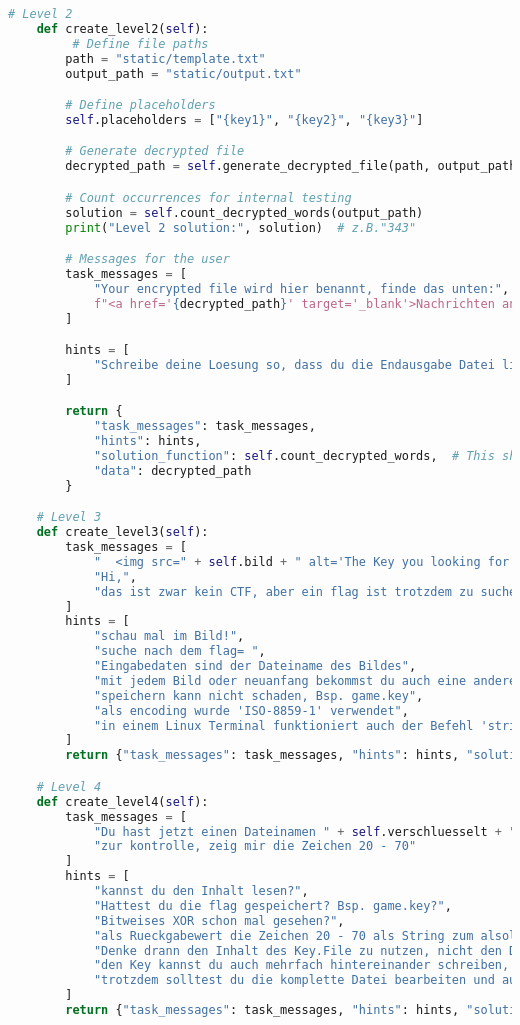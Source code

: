 \documentclass[a4paper 11pt]{article}
\begin{document}
\begin{lstlisting}[language=python, caption=der Raum]
    # Level 2
    def create_level2(self):
         # Define file paths
        path = "static/template.txt"
        output_path = "static/output.txt"

        # Define placeholders
        self.placeholders = ["{key1}", "{key2}", "{key3}"]

        # Generate decrypted file
        decrypted_path = self.generate_decrypted_file(path, output_path)

        # Count occurrences for internal testing
        solution = self.count_decrypted_words(output_path)
        print("Level 2 solution:", solution)  # z.B."343"

        # Messages for the user
        task_messages = [
            "Your encrypted file wird hier benannt, finde das unten:",
            f"<a href='{decrypted_path}' target='_blank'>Nachrichten ansehen</a>"
        ]

        hints = [
            "Schreibe deine Loesung so, dass du die Endausgabe Datei liest und die UTC-Zahlen ersetzt."
        ]

        return {
            "task_messages": task_messages,
            "hints": hints,
            "solution_function": self.count_decrypted_words,  # This should be your checker
            "data": decrypted_path
        }

    # Level 3
    def create_level3(self):
        task_messages = [
            "  <img src=" + self.bild + " alt='The Key you looking for' height='150'/> ",
            "Hi,",
			"das ist zwar kein CTF, aber ein flag ist trotzdem zu suchen",
        ]
        hints = [
            "schau mal im Bild!",
            "suche nach dem flag= ",
            "Eingabedaten sind der Dateiname des Bildes",
            "mit jedem Bild oder neuanfang bekommst du auch eine andere flag",
            "speichern kann nicht schaden, Bsp. game.key",
            "als encoding wurde 'ISO-8859-1' verwendet",
            "in einem Linux Terminal funktioniert auch der Befehl 'strings [Dateiname]' "
        ]
        return {"task_messages": task_messages, "hints": hints, "solution_function": STEGO.im_bild_finden, "data": self.bild}

    # Level 4
    def create_level4(self):
        task_messages = [
            "Du hast jetzt einen Dateinamen " + self.verschluesselt + ", schon mar reingeschaut?",
            "zur kontrolle, zeig mir die Zeichen 20 - 70"
        ]
        hints = [
            "kannst du den Inhalt lesen?",
            "Hattest du die flag gespeichert? Bsp. game.key?",
            "Bitweises XOR schon mal gesehen?",
            "als Rueckgabewert die Zeichen 20 - 70 als String zum alsolvieren dieses Level sollten erstmal reichen",
            "Denke drann den Inhalt des Key.File zu nutzen, nicht den Dateinamen",
            "den Key kannst du auch mehrfach hintereinander schreiben, falls er nicht lang genug ist",
            "trotzdem solltest du die komplette Datei bearbeiten und auch wieder speichern. Bsp. ausgabe_encrypt.txt"
        ]
        return {"task_messages": task_messages, "hints": hints, "solution_function": CRYPT.entschluesseln, "data": self.verschluesselt}


\end{lstlisting}
\end{document}
